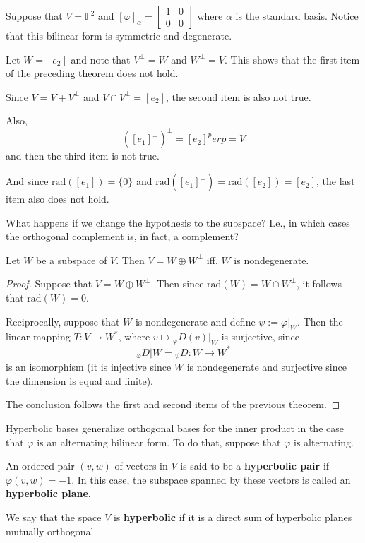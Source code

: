\begin{example}
  Suppose that $V = \mathbb{F}^2$ and $[\varphi]_\alpha = \begin{bmatrix}
    1 & 0 \\
    0 & 0
  \end{bmatrix}$ where $\alpha$ is the standard basis. Notice that this bilinear form is symmetric and degenerate. 

  Let $W = [e_2]$ and note that $V^\perp = W$ and $W^\perp = V$. This shows that the first item of the preceding theorem does not hold.  

  Since $V = V + V^\perp$ and $V \cap V^\perp = [e_2]$, the second item is also not true. 

  Also, 
  \[
    ([e_1]^\perp)^\perp = [e_2]^perp = V
  \]
  and then the third item is not true. 

  And since $\text{rad}([e_1]) = \{ 0 \}$ and $\text{rad}([e_1]^\perp) = \text{rad}([e_2]) = [e_2]$, the last item also does not hold. 
\end{example}

What happens if we change the hypothesis to the subspace?  I.e., in which cases the orthogonal complement is, in fact, a complement? 

\begin{theorem}\label{thm:202212301117}
  Let $W$ be a subspace of $V$. Then $V = W \oplus W^\perp$ iff. $W$ is nondegenerate.
\end{theorem}

\begin{proof}
  Suppose that $V = W \oplus W^\perp$. Then since $\text{rad}(W) = W \cap W^\perp$, it follows that $\text{rad}(W) = 0$. 

  Reciprocally, suppose that $W$ is nondegenerate and define $\psi := \varphi|_W$. Then the linear mapping $T : V \longrightarrow W^\ast$, where $v \longmapsto {}_\varphi D(v)|_W$ is surjective, since 
  \[
    {}_\varphi D|W = {}_\psi D : W \longrightarrow W^\ast 
  \]
  is an isomorphism (it is injective since $W$ is nondegenerate and surjective since the dimension is equal and finite).

  The conclusion follows the first and second items of the previous theorem. 
\end{proof}

Hyperbolic bases generalize orthogonal bases for the inner product in the case that $\varphi$ is an alternating bilinear form. To do that, suppose that $\varphi$ is alternating. 

\begin{definition}[Hyperbolic]
  An ordered pair $(v,w)$ of vectors in $V$ is said to be a \textbf{hyperbolic pair} if $\varphi(v,w) = -1$. In this case, the subspace spanned by these vectors is called an \textbf{hyperbolic plane}. 

  We say that the space $V$ is \textbf{hyperbolic} if it is a direct sum of hyperbolic planes mutually orthogonal. 
\end{definition}

